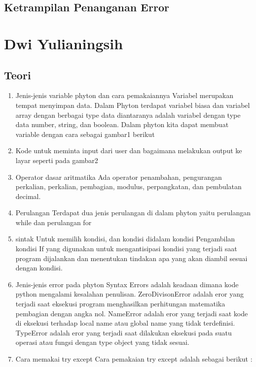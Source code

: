 \subsection{Ketrampilan Penanganan Error}
    
\section{Dwi Yulianingsih}
\subsection{Teori}
\begin{enumerate}
    \item Jenis-jenis variable phyton dan cara pemakaiannya
Variabel merupakan tempat menyimpan data. Dalam Phyton terdapat variabel biasa dan variabel array dengan berbagai type data diantaranya adalah variabel dengan type data number, string, dan boolean. Dalam phyton kita dapat membuat variable dengan cara sebagai gambar1 berikut
    

    \item Kode untuk meminta input dari user dan bagaimana melakukan output ke layar seperti pada gambar2
    

    \item Operator dasar aritmatika
Ada operator penambahan, pengurangan perkalian, perkalian, pembagian, modulus, perpangkatan, dan pembulatan decimal.
    

    \item Perulangan
Terdapat dua jenis perulangan di dalam phyton yaitu perulangan while dan perulangan for
    

    \item sintak Untuk memilih kondisi, dan kondisi didalam kondisi
Pengambilan kondisi If yang digunakan untuk mengantisipasi kondisi yang terjadi saat program dijalankan dan menentukan tindakan apa yang akan diambil sesuai dengan kondisi.
    


    \item Jenis-jenis error pada phyton
Syntax Errors adalah keadaan dimana kode python mengalami kesalahan penulisan. 
ZeroDivisonError adalah eror yang terjadi saat eksekusi program menghasilkan perhitungan matematika pembagian dengan angka nol.
NameError adalah eror yang terjadi saat kode di eksekusi terhadap local name atau global name yang tidak terdefinisi. 
TypeError adalah eror yang terjadi saat dilakukan eksekusi pada suatu operasi atau fungsi dengan type object yang tidak sesuai.

    \item Cara memakai try except
Cara pemakaian try except adalah sebagai berikut :
    


\end{enumerate}

